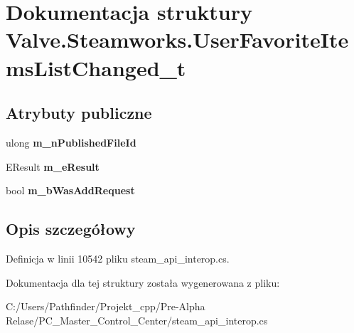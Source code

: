 \hypertarget{struct_valve_1_1_steamworks_1_1_user_favorite_items_list_changed__t}{}\section{Dokumentacja struktury Valve.\+Steamworks.\+User\+Favorite\+Items\+List\+Changed\+\_\+t}
\label{struct_valve_1_1_steamworks_1_1_user_favorite_items_list_changed__t}
\subsection*{Atrybuty publiczne}
\begin{DoxyCompactItemize}
\item 
\mbox{\label{struct_valve_1_1_steamworks_1_1_user_favorite_items_list_changed__t_acf4ba4555968b7202e71d9b763168ab3}} 
ulong {\bfseries m\+\_\+n\+Published\+File\+Id}
\item 
\mbox{\label{struct_valve_1_1_steamworks_1_1_user_favorite_items_list_changed__t_a680e1cd540ed5e3f86fa1b1484718a02}} 
E\+Result {\bfseries m\+\_\+e\+Result}
\item 
\mbox{\label{struct_valve_1_1_steamworks_1_1_user_favorite_items_list_changed__t_a9b4a2b9a8d40a5759867e2752e6a57e7}} 
bool {\bfseries m\+\_\+b\+Was\+Add\+Request}
\end{DoxyCompactItemize}


\subsection{Opis szczegółowy}


Definicja w linii 10542 pliku steam\+\_\+api\+\_\+interop.\+cs.



Dokumentacja dla tej struktury została wygenerowana z pliku\+:\begin{DoxyCompactItemize}
\item 
C\+:/\+Users/\+Pathfinder/\+Projekt\+\_\+cpp/\+Pre-\/\+Alpha Relase/\+P\+C\+\_\+\+Master\+\_\+\+Control\+\_\+\+Center/steam\+\_\+api\+\_\+interop.\+cs\end{DoxyCompactItemize}
